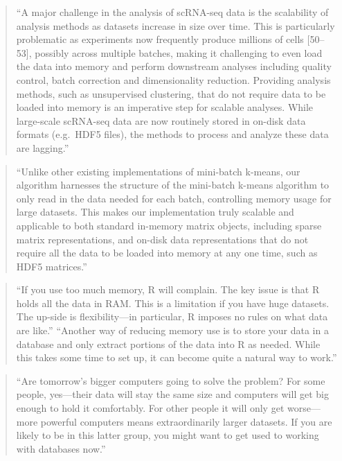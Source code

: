 \documentclass[]{tufte-book}
\begin{document}
\begin{quote}
``A major challenge in the analysis of scRNA-seq data is the scalability of analysis methods as datasets increase in size over time. This is particularly problematic as experiments now frequently produce millions of cells {[}50--53{]}, possibly across multiple batches, making it challenging to even load the data into memory and perform downstream analyses including quality control, batch correction and dimensionality reduction. Providing analysis methods, such as unsupervised clustering, that do not require data to be loaded into memory is an imperative step for scalable analyses. While large-scale scRNA-seq data are now routinely stored in on-disk data formats (e.g.~HDF5 files), the methods to process and analyze these data are lagging.'' \citep{hicks2021mbkmeans}
\end{quote}

\begin{quote}
``Unlike other existing implementations of mini-batch k-means, our algorithm harnesses the structure of the mini-batch k-means algorithm to only read in the data needed for each batch, controlling memory usage for large datasets. This makes our implementation truly scalable and applicable to both standard in-memory matrix objects, including sparse matrix representations, and on-disk data representations that do not require all the data to be loaded into memory at any one time, such as HDF5 matrices.'' \citep{hicks2021mbkmeans}
\end{quote}

\begin{quote}
``If you use too much memory, R will complain. The key issue is that R holds
all the data in RAM. This is a limitation if you have huge datasets. The up-side
is flexibility---in particular, R imposes no rules on what data are like.'' \citep{burns2011r}
``Another way of reducing memory use is to store your data in a database and
only extract portions of the data into R as needed. While this takes some time
to set up, it can become quite a natural way to work.'' \citep{burns2011r}
\end{quote}

\begin{quote}
``Are tomorrow's bigger computers going to solve the problem? For some people,
yes---their data will stay the same size and computers will get big enough to
hold it comfortably. For other people it will only get worse---more powerful
computers means extraordinarily larger datasets. If you are likely to be in this
latter group, you might want to get used to working with databases now.'' \citep{burns2011r}
\end{quote}
\end{document}

